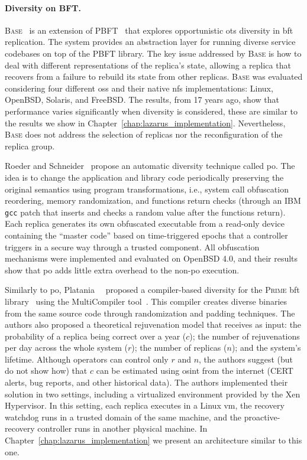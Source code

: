 \paragraph{Diversity on BFT.}
\textsc{Base}~\cite{Castro:2003} is an extension of PBFT~\cite{Castro:1999} that explores opportunistic \gls{ots} diversity in \gls{bft} replication. 
The system provides an abstraction layer for running diverse service codebases on top of the PBFT library.
The key issue addressed by \textsc{Base} is how to deal with different representations of the replica's state, allowing a replica that recovers from a failure to rebuild its state from other replicas. 
\textsc{Base} was evaluated considering four different \glspl{os} and their native \gls{nfs} implementations: Linux, OpenBSD, Solaris, and FreeBSD.
The results, from 17 years ago, show that performance varies significantly when diversity is considered, these are similar to the results we show in Chapter~\ref{chap:lazarus_implementation}.
Nevertheless, \textsc{Base} does not address the selection of replicas nor the reconfiguration of the replica group.

Roeder and Schneider~\cite{Roeder:2010} propose an automatic diversity technique called \gls{po}.
The idea is to change the application and library code periodically preserving the original semantics using program transformations, i.e., system call obfuscation reordering, memory randomization, and functions return checks (through an IBM \texttt{gcc} patch that inserts and checks a random value after the functions return).
Each replica generates its own obfuscated executable from a read-only device containing the ``master code'' based on time-triggered epochs that a controller triggers in a secure way through a trusted component.
All obfuscation mechanisms were implemented and evaluated on OpenBSD 4.0, and their results show that \gls{po} adds little extra overhead to the non-\gls{po} execution.

Similarly to \gls{po}, Platania~\etal{}~\cite{Platania:2014} proposed a compiler-based diversity for the \textsc{Prime} \gls{bft} library~\cite{Amir:2011} using the MultiCompiler tool~\cite{Homescu:2013}. 
This compiler creates diverse binaries from the same source code through randomization and padding techniques.
The authors also proposed a theoretical rejuvenation model that receives as input: the probability of a replica being correct over a year ($c$); the number of rejuvenations per day across the whole system ($r$); the number of replicas ($n$); and the system's lifetime. 
Although operators can control only $r$ and $n$, the authors suggest (but do not show how) that $c$ can be estimated using \gls{osint} from the internet (CERT alerts, bug reports, and other historical data).
The authors implemented their solution in two settings, including a virtualized environment provided by the Xen Hypervisor.
In this setting, each replica executes in a Linux \gls{vm}, the recovery watchdog runs in a trusted domain of the same machine, and the proactive-recovery controller runs in another physical machine. In Chapter~\ref{chap:lazarus_implementation} we present an architecture similar to this one.


